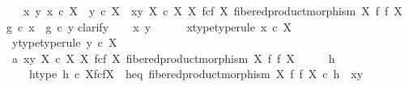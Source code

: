 \begin{isabellebody}
\ \ \ {\isachardoublequoteopen}{\isasymforall}x\ y{\isachardot}{\kern0pt}\ x\ {\isasymin}\isactrlsub c\ X\ {\isasymlongrightarrow}\ y\ {\isasymin}\isactrlsub c\ X\ {\isasymlongrightarrow}\ {\isasymlangle}x{\isacharcomma}{\kern0pt}y{\isasymrangle}\ {\isasymin}\isactrlbsub X\ {\isasymtimes}\isactrlsub c\ X\isactrlesub \ {\isacharparenleft}{\kern0pt}X\ \isactrlbsub f\isactrlesub {\isasymtimes}\isactrlsub c\isactrlbsub f\isactrlesub \ X{\isacharcomma}{\kern0pt}\ fibered{\isacharunderscore}{\kern0pt}product{\isacharunderscore}{\kern0pt}morphism\ X\ f\ f\ X{\isacharparenright}{\kern0pt}\ {\isasymlongrightarrow}\ g\ {\isasymcirc}\isactrlsub c\ x\ {\isacharequal}{\kern0pt}\ g\ {\isasymcirc}\isactrlsub c\ y{\isachardoublequoteclose}\isanewline
%
\isadelimproof
%
\endisadelimproof
%
\isatagproof
{}\isamarkupfalse%
{\isacharparenleft}{\kern0pt}clarify{\isacharparenright}{\kern0pt}\isanewline
\ \ \isamarkupfalse%
\ x\ y\ \ \isanewline
\ \ \isamarkupfalse%
\ x{\isacharunderscore}{\kern0pt}type{\isacharbrackleft}{\kern0pt}type{\isacharunderscore}{\kern0pt}rule{\isacharbrackright}{\kern0pt}{\isacharcolon}{\kern0pt}\ {\isachardoublequoteopen}x\ {\isasymin}\isactrlsub c\ X{\isachardoublequoteclose}\isanewline
\ \ \isamarkupfalse%
\ y{\isacharunderscore}{\kern0pt}type{\isacharbrackleft}{\kern0pt}type{\isacharunderscore}{\kern0pt}rule{\isacharbrackright}{\kern0pt}{\isacharcolon}{\kern0pt}\ {\isachardoublequoteopen}y\ {\isasymin}\isactrlsub c\ X{\isachardoublequoteclose}\isanewline
\ \ \isamarkupfalse%
\ a{}{\isacharcolon}{\kern0pt}\ {\isachardoublequoteopen}{\isasymlangle}x{\isacharcomma}{\kern0pt}y{\isasymrangle}\ {\isasymin}\isactrlbsub X\ {\isasymtimes}\isactrlsub c\ X\isactrlesub \ {\isacharparenleft}{\kern0pt}X\ \isactrlbsub f\isactrlesub {\isasymtimes}\isactrlsub c\isactrlbsub f\isactrlesub \ X{\isacharcomma}{\kern0pt}\ fibered{\isacharunderscore}{\kern0pt}product{\isacharunderscore}{\kern0pt}morphism\ X\ f\ f\ X{\isacharparenright}{\kern0pt}{\isachardoublequoteclose}\isanewline
\ \ \isamarkupfalse%
\ \isamarkupfalse%
\ h\ \isanewline
\ \ \ \ h{\isacharunderscore}{\kern0pt}type{\isacharcolon}{\kern0pt}\ {\isachardoublequoteopen}h\ {\isasymin}\isactrlsub c\ X\isactrlbsub f\isactrlesub {\isasymtimes}\isactrlsub c\isactrlbsub f\isactrlesub X{\isachardoublequoteclose}\ \ h{\isacharunderscore}{\kern0pt}eq{\isacharcolon}{\kern0pt}\ {\isachardoublequoteopen}fibered{\isacharunderscore}{\kern0pt}product{\isacharunderscore}{\kern0pt}morphism\ X\ f\ f\ X\ {\isasymcirc}\isactrlsub c\ h\ {\isacharequal}{\kern0pt}\ {\isasymlangle}x{\isacharcomma}{\kern0pt}y{\isasymrangle}{\isachardoublequoteclose}\isanewline

\end{isabellebody}
